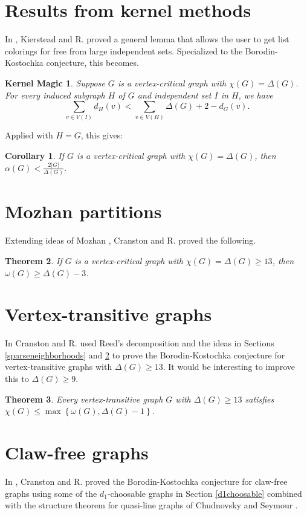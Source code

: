\documentclass[12pt]{article}
\theoremstyle{plain}
\newtheorem{thm}{Theorem}
\newtheorem{cor}[thm]{Corollary}
\newtheorem*{KernelMagic}{Kernel Magic}
\theoremstyle{definition}
\theoremstyle{remark}
\newcommand{\set}[1]{\left\{ #1 \right\}}
\newcommand{\card}[1]{\left|#1\right|}
\begin{document}
\section{Results from kernel methods}
In \cite{KernelMagic}, Kierstead and R. proved a general lemma that allows the user to get list colorings for free from large independent sets.  
Specialized to the Borodin-Kostochka conjecture,
this becomes.

\begin{KernelMagic}
Suppose $G$ is a vertex-critical graph with $\chi(G) = \Delta(G)$.  For every induced subgraph $H$ of $G$ and independent set $I$ in $H$, we have
\[\sum_{v \in V(I)} d_H(v) < \sum_{v \in V(H)} \Delta(G) + 2 - d_G(v).\]
\end{KernelMagic}

Applied with $H=G$, this gives:
\begin{cor}
If $G$ is a vertex-critical graph with $\chi(G) = \Delta(G)$, then $\alpha(G) < \frac{2\card{G}}{\Delta(G)}$.
\end{cor}

\section{Mozhan partitions}\label{shuffle}
Extending ideas of Mozhan \cite{mozhan1983}, Cranston and R. \cite{bigcliques} proved the following.
\begin{thm}
If $G$ is a vertex-critical graph with $\chi(G) = \Delta(G) \ge 13$, then $\omega(G) \ge \Delta(G) - 3$.
\end{thm}

\section{Vertex-transitive graphs}
In \cite{vertextransitive} Cranston and R. used Reed's decomposition and the ideas in Sections \ref{sparseneighborhoods} and \ref{shuffle} to prove the Borodin-Kostochka conjecture for 
vertex-transitive graphs with $\Delta(G) \ge 13$.  It would be interesting to improve this to $\Delta(G) \ge 9$.

\begin{thm}
Every vertex-transitive graph $G$ with $\Delta(G) \ge 13$ satisfies $\chi(G) \le \max\set{\omega(G), \Delta(G) - 1}$.
\end{thm}

\section{Claw-free graphs}
In \cite{cranstonrabernclaw}, Cranston and R. proved the Borodin-Kostochka conjecture for claw-free graphs using some of the $d_1$-choosable graphs in Section \ref{d1choosable} 
combined with the structure theorem for quasi-line graphs of Chudnovsky and Seymour \cite{chudnovsky2005structure}.


\end{document}
